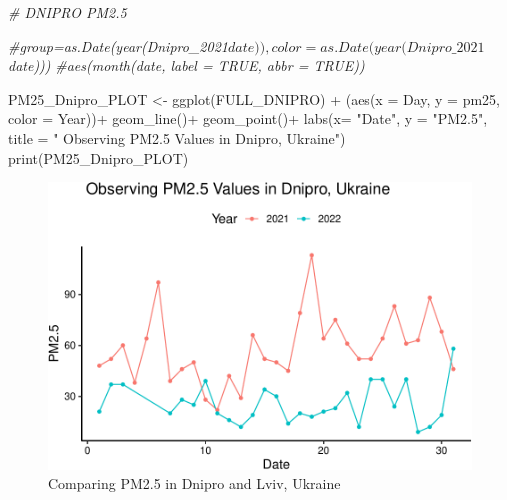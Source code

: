 \documentclass[
  12pt,
]{article}
\newenvironment{Shaded}{\begin{snugshade}}{\end{snugshade}}
\newcommand{\AttributeTok}[1]{\textcolor[rgb]{0.77,0.63,0.00}{#1}}
\newcommand{\CommentTok}[1]{\textcolor[rgb]{0.56,0.35,0.01}{\textit{#1}}}
\newcommand{\FunctionTok}[1]{\textcolor[rgb]{0.00,0.00,0.00}{#1}}
\newcommand{\NormalTok}[1]{#1}
\newcommand{\OtherTok}[1]{\textcolor[rgb]{0.56,0.35,0.01}{#1}}
\newcommand{\SpecialCharTok}[1]{\textcolor[rgb]{0.00,0.00,0.00}{#1}}
\newcommand{\StringTok}[1]{\textcolor[rgb]{0.31,0.60,0.02}{#1}}
\begin{document}
\begin{Shaded}
\begin{Highlighting}[]
\CommentTok{\# DNIPRO PM2.5}

\CommentTok{\#group=as.Date(year(Dnipro\_2021$date)), color =as.Date(year(Dnipro\_2021$date)))}
\CommentTok{\#aes(month(date, label = TRUE, abbr = TRUE)) }

\NormalTok{PM25\_Dnipro\_PLOT }\OtherTok{\textless{}{-}} 
  \FunctionTok{ggplot}\NormalTok{(FULL\_DNIPRO) }\SpecialCharTok{+} 
\NormalTok{  (}\FunctionTok{aes}\NormalTok{(}\AttributeTok{x =}\NormalTok{ Day, }\AttributeTok{y =}\NormalTok{ pm25, }\AttributeTok{color =}\NormalTok{ Year))}\SpecialCharTok{+} 
  \FunctionTok{geom\_line}\NormalTok{()}\SpecialCharTok{+}  
  \FunctionTok{geom\_point}\NormalTok{()}\SpecialCharTok{+}
  \FunctionTok{labs}\NormalTok{(}\AttributeTok{x=} \StringTok{"Date"}\NormalTok{, }\AttributeTok{y =} \StringTok{"PM2.5"}\NormalTok{,}
       \AttributeTok{title =} \StringTok{" Observing PM2.5 Values in Dnipro, Ukraine"}\NormalTok{)}
\FunctionTok{print}\NormalTok{(PM25\_Dnipro\_PLOT)}
\end{Highlighting}
\end{Shaded}

\begin{figure}
\centering
\includegraphics{Fontanie_Gordon_Weinberg_Project_files/figure-latex/Plotting.PM25-1.pdf}
\caption{Comparing PM2.5 in Dnipro and Lviv, Ukraine}
\end{figure}
\end{document}
